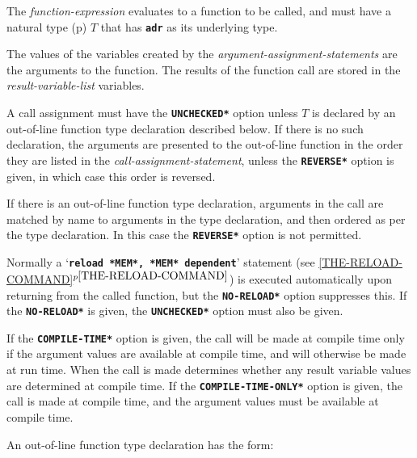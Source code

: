 \documentclass[12pt]{article}
\makeatletter
\newcommand{\TT}[1]{{\tt \bfseries #1}}
\newcommand{\ttkey}[1]{\TT{#1}\index{#1@{\tt #1}}}
\newcommand{\itemref}[1]{\ref{#1}$^{p\pageref{#1}}$}
\newcommand{\pagref}[1]{p\pageref{#1}}
\makeatother
\begin{document}
The {\em function-expression} evaluates to a function to be called,
and must have a natural type (\pagref{NATURAL-TYPE})
$T$ that has \TT{adr} as its underlying type.

The values of the variables created by the {\em argument-assignment-statements}
are the arguments to the function.
The results of the function call are stored in the
{\em result-variable-list} variables.

A call assignment must have the \TT{*UNCHECKED*} option
unless $T$ is declared by an out-of-line
function type declaration described below.  If there is no
such declaration, the arguments are presented to the out-of-line
function in the order they are listed in the {\em call-assignment-statement},
unless the \TT{*REVERSE*} option is given, in which case this order
is reversed.

If there is an out-of-line function type declaration, arguments in the
call are matched by name to arguments in the type declaration,
and then ordered as per the type declaration.  In this case
the \TT{*REVERSE*} option is not permitted.

Normally a `\TT{reload *MEM*, *MEM* dependent}'
statement (see \itemref{THE-RELOAD-COMMAND})
is executed automatically
upon returning from the called function, but the
\ttkey{*NO-RELOAD*} option suppresses this.
If the \TT{*NO-RELOAD*} is given, the \TT{*UNCHECKED*} option must
also be given.

If the \TT{*COMPILE-TIME*} option is given, the call
will be made at compile time only if the argument values are available
at compile time, and will otherwise be made at run time.  When the call
is made determines whether any result variable values are determined
at compile time.  If the \TT{*COMPILE-TIME-ONLY*} option is given,
the call is made at compile time, and the argument values must be
available at compile time.

An out-of-line function type declaration has the form:
\end{document}
